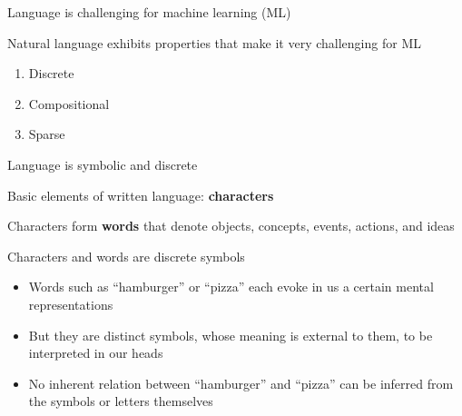 \documentclass[12pt,aspectratio=169,handout]{beamer}
\begin{document}
%	
%	


\begin{frame}{Language is challenging for machine learning (ML)}
	
	Natural language exhibits properties that make it very challenging for ML
	
	\begin{enumerate}
		\item Discrete
		\item Compositional
		\item Sparse
	\end{enumerate}
	
\end{frame}

\begin{frame}{Language is symbolic and discrete}
	
	Basic elements of written language: \textbf{characters}
	
	Characters form \textbf{words} that denote objects, concepts, events, actions, and ideas
	
	\begin{block}{Characters and words are discrete symbols}
		\begin{itemize}
			\item Words such as ``hamburger'' or ``pizza'' each evoke in us a certain mental representations
			\item But they are distinct symbols, whose meaning is external to them, to be interpreted in our heads
			\item No inherent relation between ``hamburger'' and ``pizza'' can be inferred from the symbols or letters themselves
		\end{itemize}
	\end{block}
	
\end{frame}
\end{document}
